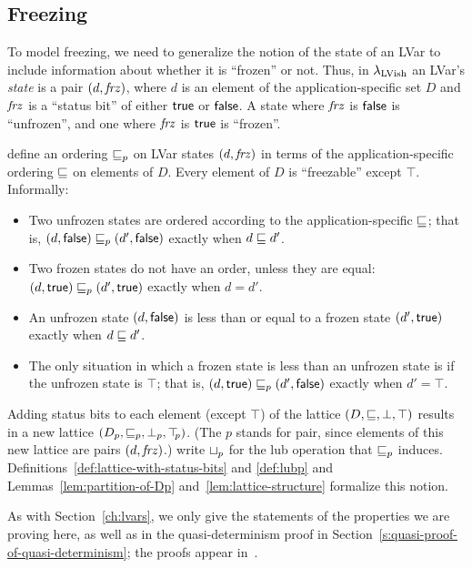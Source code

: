 \subsection{Freezing}

To model freezing, we need to generalize the notion of the state of an
LVar to include information about whether it is ``frozen'' or not.
Thus, in $\lambda_{\textrm{LVish}}$ an LVar's \emph{state} is a pair
$(d, \mathit{frz})$, where $d$ is an element of the
application-specific set $D$ and $\mathit{frz}$ is a ``status bit'' of
either $\textsf{true}$ or $\textsf{false}$.  A state where $\mathit{frz}$ is
$\textsf{false}$ is ``unfrozen'', and one where $\mathit{frz}$ is
$\textsf{true}$ is ``frozen''.

 define an ordering $\sqsubseteq_p$ on LVar states $(d, \mathit{frz})$ in
terms of the application-specific ordering $\sqsubseteq$ on elements of
$D$.  Every element of $D$ is ``freezable'' except $\top$.
Informally:
\begin{itemize}
\item Two unfrozen states are ordered according to the
  application-specific $\sqsubseteq$; that is, $(d, \textsf{false})
  \sqsubseteq_p (d', \textsf{false})$ exactly when $d \sqsubseteq d'$.
\item Two frozen states do not have an order, unless they are equal:
  $(d, \textsf{true}) \sqsubseteq_p (d', \textsf{true})$ exactly when
  $d = d'$.
\item An unfrozen state $(d, \textsf{false})$ is less than or
  equal to a frozen state $(d', \textsf{true})$ exactly when $d
  \sqsubseteq d'$.
\item The only situation in which a frozen state is less than an
  unfrozen state is if the unfrozen state is $\top$; that is,
  $(d, \textsf{true}) \sqsubseteq_p (d', \textsf{false})$ exactly when
  $d' = \top$.
\end{itemize}
Adding status bits to each element (except $\top$) of the lattice $(D,
\sqsubseteq, \bot, \top)$ results in a new lattice $(D_p, \sqsubseteq_p, \bot_{p},
\top\hspace{-0.85mm}_{p})$.  (The $p$ stands for pair, since elements of this new lattice
are pairs $(d, \mathit{frz})$.)  write $ \sqcup_p $ for the lub
operation that $\sqsubseteq_p$ induces.
Definitions~\ref{def:lattice-with-status-bits} and \ref{def:lubp} and
Lemmas~\ref{lem:partition-of-Dp} and~\ref{lem:lattice-structure}
formalize this notion.

\ifdefined\JOURNAL
As with Section~\ref{ch:lvars}, we only give the statements of the
properties we are proving here, as well as in the quasi-determinism
proof in Section~\ref{s:quasi-proof-of-quasi-determinism}; the proofs
appear in~\cite{lvars-dissertation}.
\fi

